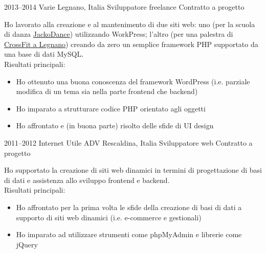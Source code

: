 \documentclass[print]{friggeri-custom} %
\begin{document}
\begin{entrylist}


\expentry
{2013--2014}
{Varie}
{Legnano, Italia}
{Sviluppatore freelance}
{Contratto a progetto}
{Ho lavorato alla creazione e al mantenimento di due siti web: uno (per la scuola di danza \href{http://jackodance.it}{JackoDance}) utilizzando WorkPress; l'altro (per una palestra di \href{http://crossfitlegnano.com}{CrossFit a Legnano}) creando da zero un semplice framework PHP supportato da una base di dati MySQL. \\
Risultati principali:
\begin{itemize}
  \item Ho ottenuto una buona conoscenza del framework WordPress (i.e. parziale modifica di un tema sia nella parte frontend che backend)
  \item Ho imparato a strutturare codice PHP orientato agli oggetti
  \item Ho affrontato e (in buona parte) risolto delle sfide di UI design
\end{itemize}}


\expentry
{2011--2012}
{Internet Utile ADV}
{Rescaldina, Italia}
{Sviluppatore web}
{Contratto a progetto}
{Ho supportato la creazione di siti web dinamici in termini di progettazione di basi di dati e assistenza allo sviluppo frontend e backend. \\
Risultati principali:
\begin{itemize}
  \item Ho affrontato per la prima volta le sfide della creazione di basi di dati a supporto di siti web dinamici (i.e. e-commerce e gestionali)
  \item Ho imparato ad utilizzare strumenti come phpMyAdmin e librerie come jQuery
\end{itemize}}


\end{entrylist}
\end{document}

